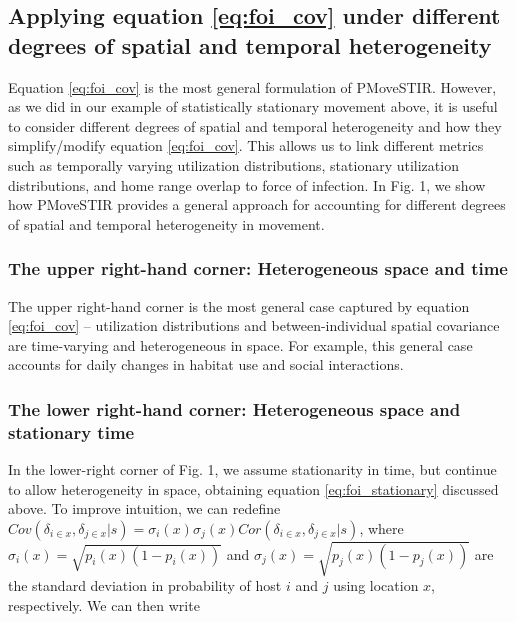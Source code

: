 \documentclass[letterpaper]{article}
\begin{document}

\subsection*{Applying equation \ref{eq:foi_cov} under different degrees of spatial and temporal heterogeneity}

Equation \ref{eq:foi_cov} is the most general formulation of PMoveSTIR. However, as we did in our example of statistically stationary movement above, it is useful to consider different degrees of spatial and temporal heterogeneity and how they simplify/modify equation \ref{eq:foi_cov}. This allows us to link different metrics such as temporally varying utilization distributions, stationary utilization distributions, and home range overlap to force of infection. In Fig. 1, we show how PMoveSTIR provides a general approach for accounting for different degrees of spatial and temporal heterogeneity in movement.

\subsubsection*{The upper right-hand corner: Heterogeneous space and time}

The upper right-hand corner is the most general case captured by equation \ref{eq:foi_cov} -- utilization distributions and between-individual spatial covariance are time-varying and heterogeneous in space.  For example, this general case accounts for daily changes in habitat use and social interactions. 

\subsubsection*{The lower right-hand corner: Heterogeneous space and stationary time}

In the lower-right corner of Fig. 1, we assume stationarity in time, but continue to allow heterogeneity in space, obtaining equation \ref{eq:foi_stationary} discussed above.  To improve intuition, we can redefine $Cov(\delta_{i \in x}, \delta_{j \in x} | s) = \sigma_i(x) \sigma_j(x) Cor(\delta_{i \in x}, \delta_{j \in x} | s)$, where $\sigma_i(x) = \sqrt{p_i(x)(1 - p_i(x))}$  and $\sigma_j(x) = \sqrt{p_j(x)(1 - p_j(x))}$ are the standard deviation in probability of host $i$ and $j$ using location $x$, respectively.  We can then write
\end{document}
